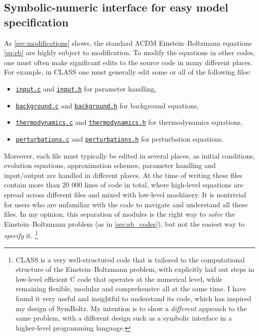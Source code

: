 \documentclass[USenglish, thumbmarks]{uiophdthesis} %
\newcommand\LCDM{\ensuremath{\mathrm{\Lambda CDM}}}
\newcommand\EB{Einstein--Boltzmann}
\begin{document}
\subsection{Symbolic-numeric interface for easy model specification}
\label{sec:symbolicnumeric}

As \cref{sec:modifications} shows, the standard \LCDM{} \EB{} equations \eqref{eq:eb} are highly subject to modification.
To modify the equations in other codes,
one must often make significant edits to the source code in many different places.
For example, in CLASS one must generally edit some or all of the following files:
\begin{itemize}
\item \href{https://github.com/lesgourg/class_public/blob/master/source/input.c}{\texttt{input.c}} and \href{https://github.com/lesgourg/class_public/blob/master/include/input.h}{\texttt{input.h}} for parameter handling,
\item \href{https://github.com/lesgourg/class_public/blob/master/source/background.c}{\texttt{background.c}} and \href{https://github.com/lesgourg/class_public/blob/master/include/background.h}{\texttt{background.h}} for background equations,
\item \href{https://github.com/lesgourg/class_public/blob/master/source/thermodynamics.c}{\texttt{thermodynamics.c}} and \href{https://github.com/lesgourg/class_public/blob/master/include/thermodynamics.h}{\texttt{thermodynamics.h}} for thermodynamics equations,
\item \href{https://github.com/lesgourg/class_public/blob/master/source/perturbations.c}{\texttt{perturbations.c}} and \href{https://github.com/lesgourg/class_public/blob/master/include/perturbations.h}{\texttt{perturbations.h}} for perturbation equations.
\end{itemize}
Moreover, each file must typically be edited in several places,
as initial conditions, evolution equations, approximation schemes, parameter handling and input/output are handled in different places.
At the time of writing these files contain more than 20 000 lines of code in total,
where high-level equations are spread across different files and mixed with low-level machinery.
It is nontrivial for users who are unfamiliar with the code to navigate and understand all these files.
In my opinion, this separation of modules
is the right way to \emph{solve} the \EB{} problem (as in \cref{sec:eb_codes}),
but not the easiest way to \emph{specify} it.%
\footnote{%
CLASS is a very well-structured code that is
tailored to the computational structure of the \EB{} problem,
with explicitly laid out steps in low-level efficient C code that operates at the numerical level,
while remaining flexible, modular and comprehensive all at the same time.
I have found it very useful and insightful to understand its code,
which has inspired my design of SymBoltz.
My intention is to show a \emph{different} approach to the same problem,
with a different design such as a symbolic interface in a higher-level programming language.}
\end{document}
